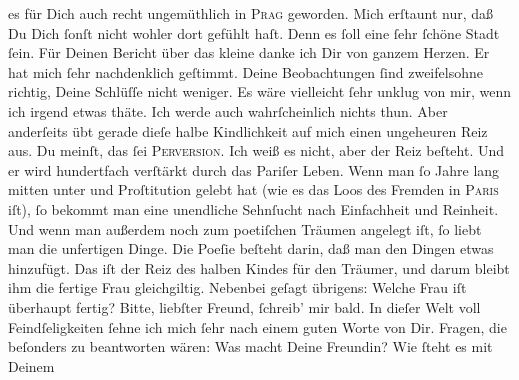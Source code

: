 \begin{ledgroupsized}[t]{13cm}
               es für Dich auch recht ungemüthlich in \textsc{Prag} geworden. Mich erſtaunt nur, daß Du Dich ſonſt nicht wohler dort gefühlt haſt.
               Denn es ſoll eine ſehr ſchöne Stadt ſein.\pend
           \pstart
           Für Deinen Bericht über das kleine \label{K_L02833-6v}\label{K_L02833-6h} danke ich Dir von ganzem Herzen. Er hat mich ſehr nachdenklich geſtimmt.
               Deine Beobachtungen {\pb}ſind zweifelsohne richtig,
               Deine  Schlüſſe nicht weniger. Es wäre vielleicht ſehr unklug von mir, wenn ich
               irgend etwas thäte. Ich werde auch wahrſcheinlich nichts thun. Aber anderſeits übt
               gerade dieſe halbe Kindlichkeit auf mich  einen ungeheuren Reiz aus. Du meinſt, das ſei \textsc{Perversion}. Ich weiß es nicht, aber der Reiz beſteht. Und er wird
               hundertfach verſtärkt durch das Pariſer Leben.
               Wenn man ſo Jahre lang mitten unter \label{K_L02833-8v}\label{K_L02833-8h} und Proſtitution gelebt hat (wie es das Loos des Fremden in \textsc{Paris} iſt), ſo bekommt man eine unendliche Sehnſucht nach {\pb}Einfachheit und Reinheit. Und wenn man außerdem noch
               zum poetiſchen Träumen  angelegt iſt, ſo liebt man
               die unfertigen Dinge. Die Poeſie beſteht darin, daß man den Dingen etwas hinzufügt.
               Das iſt der Reiz des halben Kindes für den Träumer, und darum bleibt \strikeout{\textcolor{gray}{×}\-\textcolor{gray}{×}} ihm die fertige Frau gleichgiltig. Nebenbei geſagt übrigens: Welche Frau iſt
               überhaupt fertig?\pend
           \pstart
           Bitte, liebſter Freund, ſchreib’ mir bald. In dieſer {\pb}Welt voll Feindſeligkeiten ſehne ich mich ſehr nach einem guten Worte von Dir.\pend
           \pstart
           Fragen, die beſonders zu beantworten wären: Was macht Deine Freundin?  Wie ſteht es mit Deinem \label{K_L02833-99v}
\end{ledgroupsized}
